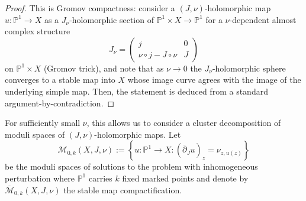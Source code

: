 \documentclass[reqno]{amsart}
\numberwithin{equation}{section}
\numberwithin{equation}{section}
\numberwithin{equation}{section}
\newtheorem{lemma}[thm]{Lemma}
\theoremstyle{definition}
\theoremstyle{remark}
\theoremstyle{remark}
\newcommand{\ov}{\overline}
\begin{document}

\begin{proof}
    This is Gromov compactness: consider a $(J, \nu)$-holomorphic map $u: \mathbb{P}^1 \to X$ as a $J_\nu$-holomorphic section of $\mathbb{P}^1 \times X \to \mathbb{P}^1$ for a $\nu$-dependent almost complex structure
    \begin{equation}
        J_\nu = \begin{pmatrix}
            j & 0 \\ \nu \circ j - J \circ \nu & J
        \end{pmatrix}
    \end{equation}
    on $\mathbb{P}^1 \times X$ (Gromov trick), and note that as $\nu \to 0$ the $J_\nu$-holomorphic sphere converges to a stable map into $X$ whose image curve agrees with the image of the underlying simple map. Then, the statement is deduced from a standard argument-by-contradiction.
\end{proof}

For sufficiently small $\nu$, this allows us to consider a cluster decomposition of moduli spaces of $(J,\nu)$-holomorphic maps. Let
\begin{equation}
    \mathcal{M}_{0, k}(X, J, \nu) := \left\{ u : \mathbb{P}^1 \to X: (\ov{\partial}_J u)_z = \nu_{z, u(z)} \right\}
\end{equation}
be the moduli spaces of solutions to the problem with inhomogeneous perturbation where $\mathbb{P}^1$ carries $k$ fixed marked points and denote by $\ov{\mathcal{M}}_{0, k}(X, J, \nu)$ the stable map compactification.
\end{document}
